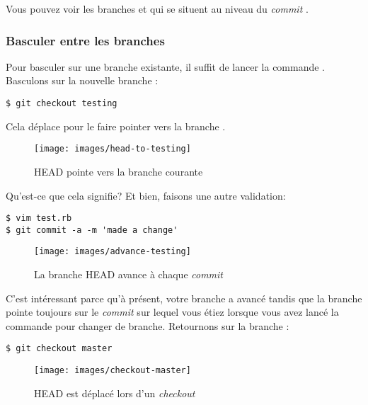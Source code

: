 Vous pouvez voir les branches   et  qui se situent au niveau du \emph{commit} .

\subsubsection{Basculer entre les branches}
\label{sec:git:switching_branches}

Pour basculer sur une branche existante, il suffit de lancer la commande .
Basculons sur la nouvelle branche :
\begin{Schunk}
\begin{Verbatim}
$ git checkout testing
\end{Verbatim}
\end{Schunk}

Cela déplace  pour le faire pointer vers la branche .

\begin{figure}[H]
  \centering
  \texttt{[image: images/head-to-testing]}
  \caption{HEAD pointe vers la branche courante}
  \label{fig:git:head-to-testing}
\end{figure}

Qu'est-ce que cela signifie?
Et bien, faisons une autre validation:
\begin{Schunk}
\begin{Verbatim}
$ vim test.rb
$ git commit -a -m 'made a change'
\end{Verbatim}
\end{Schunk}

\begin{figure}[H]
  \centering
  \texttt{[image: images/advance-testing]}
  \caption{La branche HEAD avance à chaque \emph{commit}}
  \label{fig:git:advance-testing}
\end{figure}

C'est intéressant parce qu'à présent, votre branche  a avancé tandis que la branche  pointe toujours sur le \emph{commit} sur lequel vous étiez lorsque vous avez lancé la commande  pour changer de branche.
Retournons sur la branche :
\begin{Schunk}
\begin{Verbatim}
$ git checkout master
\end{Verbatim}
\end{Schunk}

\begin{figure}[H]
  \centering
  \texttt{[image: images/checkout-master]}
  \caption{HEAD est déplacé lors d'un \emph{checkout}}
  \label{fig:git:checkout-master}
\end{figure}

